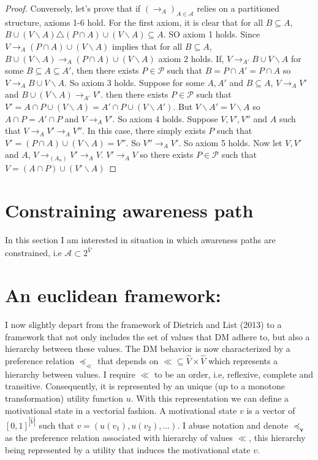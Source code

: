 \documentclass[11pt]{article}
\begin{document}
\begin{proof}
 Conversely, let's prove that if $(\rightarrow_A)_{A\in \mathcal{A}}$ relies on a partitioned structure, axioms 1-6 hold. For the first axiom, it is clear that for all $B\subseteq A$, $B\cup (V\backslash A) \triangle (P\cap A) \cup (V\backslash A)\subseteq A$. SO axiom 1 holds. Since  $V\rightarrow_A (P\cap A) \cup (V\backslash A)$ implies that for all $B\subseteq A$, $B\cup (V\backslash A) \rightarrow_A (P\cap A) \cup (V\backslash A)$ axiom 2 holds. If, $V\rightarrow_{A'} B \cup V\backslash A$ for some $B\subseteq A \subseteq A'$, then there exists $P\in \mathcal{P}$ such that $B=P\cap A'= P\cap A$ so $V\rightarrow_{A} B \cup V\backslash A$. So axiom 3 holds. Suppose for some $A,A'$ and $B\subseteq A$, $V\rightarrow_{A}V'$ and $B\cup (V\backslash A)\rightarrow_{A'} V'$. then there exists $P\in \mathcal{P}$ such that $V'= A\cap P\cup (V\backslash A) =  A'\cap P\cup (V\backslash A')$. But $V\backslash A'=V\backslash A$ so $A\cap P= A'\cap P$ and  $V\rightarrow_{A}V'$. So axiom 4 holds. Suppose $V,V', V''$ and $A$ such that $V\rightarrow_A V' \rightarrow_A V''$. In this case, there simply exists $P$ such that $V' = (P\cap A)\cup (V\backslash A)  = V''$. So $V'' \rightarrow_A V'$. So axiom 5 holds. Now let $V,V'$ and $A$, $V\rightarrow_{(A_n)} V'\rightarrow_{A} V$. $V'\rightarrow_{A}V$ so there exists $P\in \mathcal{P}$ such that $V= (A\cap P)\cup (V'\backslash A)$ 
   


\end{proof}

\section{Constraining awareness path}
In this section I am interested in situation in which awareness paths are constrained, i.e $\mathcal{A}\subset2^{\hat{V}}$

\section{An euclidean framework:}

I now slightly depart from the framework of Dietrich and List (2013) to a framework that not only includes the set of values that DM adhere to, but also a hierarchy between these values. The DM behavior is now characterized by a preference relation $\preceq_{\ll}$ that depends on $\ll \subseteq \hat{V}\times \hat{V}$ which represents a hierarchy between values. I require $\ll$ to be an order, i.e, reflexive, complete and transitive. Consequently, it is represented by an unique (up to a monotone transformation) utility function $u$. With this representation we can define a motivational state in a vectorial fashion.
A motivational state $v$ is a vector of $[0,1]^{|\hat{V}|}$ such that $v=(u(v_1),u(v_2),...)$. I abuse notation and denote $\preceq_{\textbf{v}}$ as the preference relation associated with hierarchy of values $\ll$, this hierarchy being represented by a utility that induces the motivational state $v$.
\end{document}
